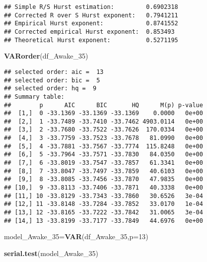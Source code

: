 \documentclass[
]{article}
\newenvironment{Shaded}{\begin{snugshade}}{\end{snugshade}}
\newcommand{\AttributeTok}[1]{\textcolor[rgb]{0.13,0.29,0.53}{#1}}
\newcommand{\DecValTok}[1]{\textcolor[rgb]{0.00,0.00,0.81}{#1}}
\newcommand{\FunctionTok}[1]{\textcolor[rgb]{0.13,0.29,0.53}{\textbf{#1}}}
\newcommand{\NormalTok}[1]{#1}
\newcommand{\OtherTok}[1]{\textcolor[rgb]{0.56,0.35,0.01}{#1}}
\newcommand{\SpecialCharTok}[1]{\textcolor[rgb]{0.81,0.36,0.00}{\textbf{#1}}}
\begin{document}
\begin{Shaded}
\end{Shaded}

\begin{verbatim}
## Simple R/S Hurst estimation:         0.6902318 
## Corrected R over S Hurst exponent:   0.7941211 
## Empirical Hurst exponent:            0.8741552 
## Corrected empirical Hurst exponent:  0.853493 
## Theoretical Hurst exponent:          0.5271195
\end{verbatim}

\begin{Shaded}
\begin{Highlighting}[]
\FunctionTok{VARorder}\NormalTok{(df\_Awake\_35)}
\end{Highlighting}
\end{Shaded}

\begin{verbatim}
## selected order: aic =  13 
## selected order: bic =  5 
## selected order: hq =  9 
## Summary table:  
##        p      AIC      BIC       HQ      M(p) p-value
##  [1,]  0 -33.1369 -33.1369 -33.1369    0.0000   0e+00
##  [2,]  1 -33.7489 -33.7410 -33.7462 4903.0114   0e+00
##  [3,]  2 -33.7680 -33.7522 -33.7626  170.0334   0e+00
##  [4,]  3 -33.7759 -33.7523 -33.7678   81.0990   0e+00
##  [5,]  4 -33.7881 -33.7567 -33.7774  115.8248   0e+00
##  [6,]  5 -33.7964 -33.7571 -33.7830   84.0350   0e+00
##  [7,]  6 -33.8019 -33.7547 -33.7857   61.3341   0e+00
##  [8,]  7 -33.8047 -33.7497 -33.7859   40.6103   0e+00
##  [9,]  8 -33.8085 -33.7456 -33.7870   47.9835   0e+00
## [10,]  9 -33.8113 -33.7406 -33.7871   40.3338   0e+00
## [11,] 10 -33.8129 -33.7343 -33.7860   30.6526   3e-04
## [12,] 11 -33.8148 -33.7284 -33.7852   33.0170   1e-04
## [13,] 12 -33.8165 -33.7222 -33.7842   31.0065   3e-04
## [14,] 13 -33.8199 -33.7177 -33.7849   44.6976   0e+00
\end{verbatim}

\begin{Shaded}
\begin{Highlighting}[]
\NormalTok{model\_Awake\_35}\OtherTok{=}\FunctionTok{VAR}\NormalTok{(df\_Awake\_35,}\AttributeTok{p=}\DecValTok{13}\NormalTok{)}

\FunctionTok{serial.test}\NormalTok{(model\_Awake\_35)}
\end{Highlighting}
\end{Shaded}
\end{document}
